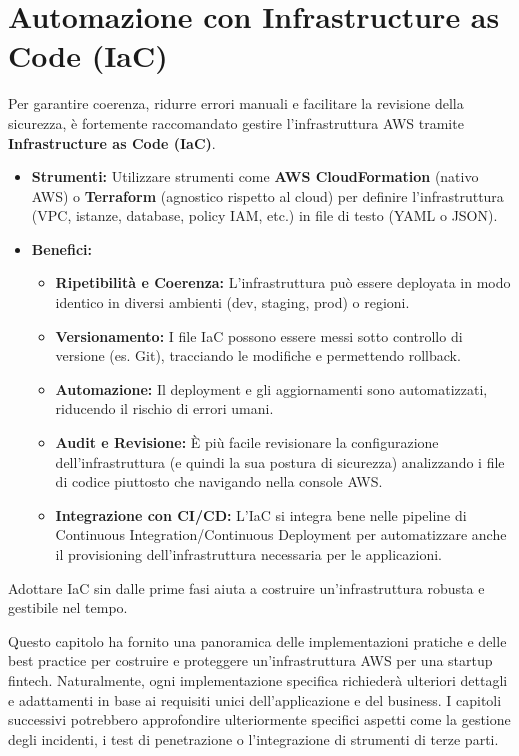 \documentclass[a4paper,12pt]{report}
\begin{document}
\section{Automazione con Infrastructure as Code (IaC)}
\label{sec:iac}
Per garantire coerenza, ridurre errori manuali e facilitare la revisione della sicurezza, è fortemente raccomandato gestire l'infrastruttura AWS tramite \textbf{Infrastructure as Code (IaC)}.
\begin{itemize}
    \item \textbf{Strumenti:} Utilizzare strumenti come \textbf{AWS CloudFormation} (nativo AWS) o \textbf{Terraform} (agnostico rispetto al cloud) per definire l'infrastruttura (VPC, istanze, database, policy IAM, etc.) in file di testo (YAML o JSON).
    \item \textbf{Benefici:}
        \begin{itemize}
            \item \textbf{Ripetibilità e Coerenza:} L'infrastruttura può essere deployata in modo identico in diversi ambienti (dev, staging, prod) o regioni.
            \item \textbf{Versionamento:} I file IaC possono essere messi sotto controllo di versione (es. Git), tracciando le modifiche e permettendo rollback.
            \item \textbf{Automazione:} Il deployment e gli aggiornamenti sono automatizzati, riducendo il rischio di errori umani.
            \item \textbf{Audit e Revisione:} È più facile revisionare la configurazione dell'infrastruttura (e quindi la sua postura di sicurezza) analizzando i file di codice piuttosto che navigando nella console AWS.
            \item \textbf{Integrazione con CI/CD:} L'IaC si integra bene nelle pipeline di Continuous Integration/Continuous Deployment per automatizzare anche il provisioning dell'infrastruttura necessaria per le applicazioni.
        \end{itemize}
\end{itemize}
Adottare IaC sin dalle prime fasi aiuta a costruire un'infrastruttura robusta e gestibile nel tempo.

Questo capitolo ha fornito una panoramica delle implementazioni pratiche e delle best practice per costruire e proteggere un'infrastruttura AWS per una startup fintech. Naturalmente, ogni implementazione specifica richiederà ulteriori dettagli e adattamenti in base ai requisiti unici dell'applicazione e del business. I capitoli successivi potrebbero approfondire ulteriormente specifici aspetti come la gestione degli incidenti, i test di penetrazione o l'integrazione di strumenti di terze parti.
\end{document}
